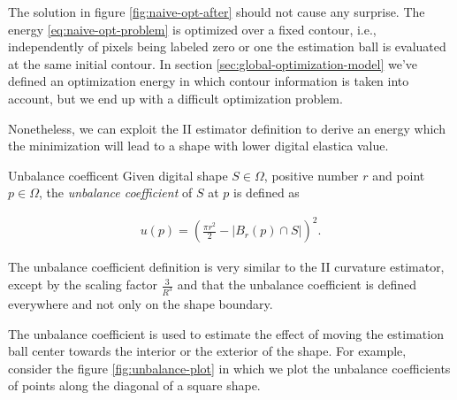 The solution in figure \ref{fig:naive-opt-after} should not cause any surprise. The energy \eqref{eq:naive-opt-problem} is optimized over a fixed contour, i.e., independently of pixels being labeled zero or one the estimation ball is evaluated at the same initial contour. In section \ref{sec:global-optimization-model} we've defined an optimization energy in which contour information is taken into account, but we end up with a difficult optimization problem.

Nonetheless, we can exploit the II estimator definition to derive an energy which the minimization will lead to a shape with lower digital elastica value.


\begin{definition}{Unbalance coefficent}
Given digital shape $S \in \Omega$, positive number $r$ and point $p \in \Omega$, the \emph{unbalance coefficient} of $S$ at $p$ is defined as

\begin{align*}
	u(p) = \left( \frac{\pi r^2}{2} - |B_r(p) \cap S| \right)^2.
\end{align*}

\end{definition}

The unbalance coefficient definition is very similar to the II curvature estimator, except by the scaling factor $\frac{3}{R^3}$ and that the unbalance coefficient is defined everywhere and not only on the shape boundary.

The unbalance coefficient is used to estimate the effect of moving the estimation ball center towards the interior or the exterior of the shape. For example, consider the figure \ref{fig:unbalance-plot} in which we plot the unbalance coefficients of points along the diagonal of a square shape. 

